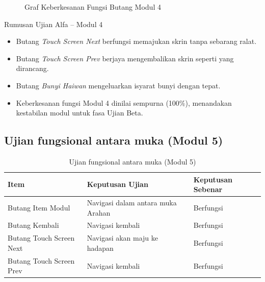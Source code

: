 {{\begin{figure}[h]
\centering
{}
\caption{Graf Keberkesanan Fungsi Butang Modul 4}
\label{rajah-5-5}
\end{figure}
Rumusan Ujian Alfa – Modul 4

\begin{itemize}[h]
  \item Butang \textit{Touch Screen Next} berfungsi memajukan skrin tanpa sebarang ralat.  
  \item Butang \textit{Touch Screen Prev} berjaya mengembalikan skrin seperti yang dirancang.  
  \item Butang \textit{Bunyi Haiwan} mengeluarkan isyarat bunyi dengan tepat.  
  \item Keberkesanan fungsi Modul 4 dinilai sempurna (100\%), menandakan kestabilan modul untuk fasa Ujian Beta.
\end{itemize}
\clearpage

\subsection{Ujian fungsional antara muka (Modul 5)}
\begin{table}[h]
\centering
\caption{Ujian fungsional antara muka (Modul 5)}
\label{jadual-5-6}
\begin{tabular}{lll}
\toprule
\textbf{Item} & \textbf{Keputusan Ujian} & \textbf{Keputusan Sebenar} \\ \midrule
Butang Item Modul & Navigasi dalam antara muka Arahan & Berfungsi \\ 
Butang Kembali & Navigasi kembali & Berfungsi \\ 
Butang Touch Screen Next & Navigasi akan maju ke hadapan & Berfungsi \\ 
Butang Touch Screen Prev & Navigasi kembali & Berfungsi \\ \bottomrule
\end{tabular}
\end{table}

}}

